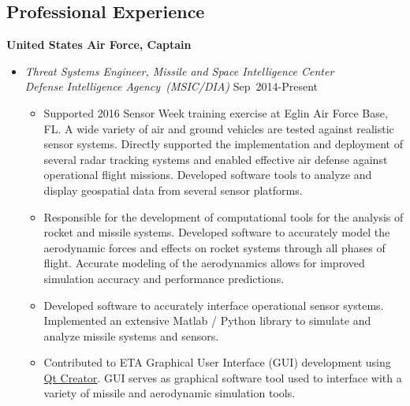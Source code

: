 \subsection*{Professional Experience}
{}

\textbf{United States Air Force, Captain}
\begin{itemize}

\item[] \textit{Threat Systems Engineer, Missile and Space Intelligence Center \\
                Defense Intelligence Agency~(MSIC/DIA)}
                \hfill {Sep~2014-Present}
\begin{itemize}
    \item Supported 2016 Sensor Week training exercise at Eglin Air Force Base, FL.
    A wide variety of air and ground vehicles are tested against realistic sensor systems. 
    Directly supported the implementation and deployment of several radar tracking systems and enabled effective air defense against operational flight missions.
    Developed software tools to analyze and display geospatial data from several sensor platforms.
    \item Responsible for the development of computational tools for the analysis of rocket and missile systems.
    Developed software to accurately model the aerodynamic forces and effects on rocket systems through all phases of flight.
    Accurate modeling of the aerodynamics allows for improved simulation accuracy and performance predictions.
    \item Developed software to accurately interface operational sensor systems.
    Implemented an extensive Matlab / Python library to simulate and analyze missile systems and sensors. 
    \item Contributed to ETA Graphical User Interface (GUI) development using \href{https://www.qt.io/ide/}{Qt Creator}.
    GUI serves as graphical software tool used to interface with a variety of missile and aerodynamic simulation tools.
\end{itemize}
        

\end{itemize}
